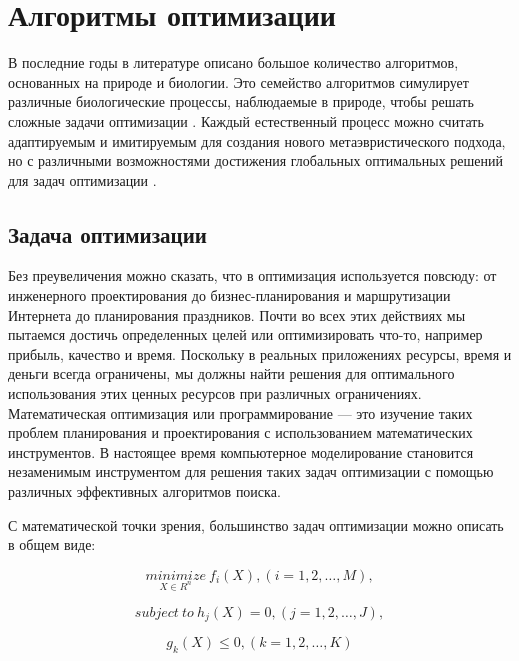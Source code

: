 \section{Алгоритмы оптимизации}\label{Section:Bio}

В последние годы в литературе описано большое количество алгоритмов,
основанных на природе и биологии. Это семейство алгоритмов симулирует
различные биологические процессы, наблюдаемые в природе, чтобы решать
сложные задачи оптимизации \cite{Yang2009}. Каждый естественный процесс
можно считать адаптируемым и имитируемым для создания нового
метаэвристического подхода, но с различными возможностями достижения
глобальных оптимальных решений для задач оптимизации \cite{BioInspiredTaxonomy}.

\subsection{Задача оптимизации}

Без преувеличения можно сказать, что в оптимизация используется повсюду: от
инженерного проектирования до бизнес-планирования и маршрутизации
Интернета до планирования праздников. Почти во всех этих действиях мы
пытаемся достичь определенных целей или оптимизировать что-то, например
прибыль, качество и время. Поскольку в реальных приложениях ресурсы,
время и деньги всегда ограничены, мы должны найти решения для оптимального
использования этих ценных ресурсов при различных ограничениях.
Математическая оптимизация или программирование — это изучение таких
проблем планирования и проектирования с использованием математических
инструментов. В настоящее время компьютерное моделирование становится
незаменимым инструментом для решения таких задач оптимизации с помощью
различных эффективных алгоритмов поиска.

С математической точки зрения, большинство задач оптимизации можно описать
в общем виде:

\begin{equation}\label{eq7}
    \underset{X \in R^n}{minimize} \: f_i(X), (i=1,2,\dots,M),
\end{equation}

\begin{equation}\label{eq8}
    subject\: to \: h_j(X) = 0, (j=1,2,\dots,J),
\end{equation}

\begin{equation}\label{eq9}
    g_k(X) \leq 0, (k=1,2,\dots,K)
\end{equation}

